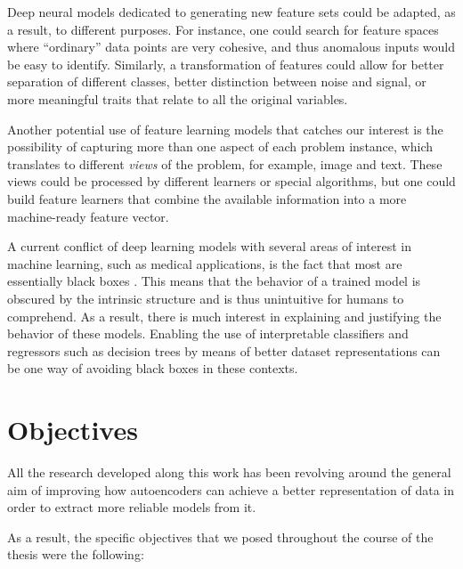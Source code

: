 Deep neural models dedicated to generating new feature sets could be adapted, as a result, to different purposes. For instance, one could search for feature spaces where ``ordinary'' data points are very cohesive, and thus anomalous inputs would be easy to identify. Similarly, a transformation of features could allow for better separation of different classes, better distinction between noise and signal, or more meaningful traits that relate to all the original variables.


Another potential use of feature learning models that catches our interest is the possibility of capturing more than one aspect of each problem instance, which translates to different \textit{views} of the problem, for example, image and text. These views could be processed by different learners or special algorithms, but one could build feature learners that combine the available information into a more machine-ready feature vector.


A current conflict of deep learning models with several areas of interest in machine learning, such as medical applications, is the fact that most are essentially black boxes . This means that the behavior of a trained model is obscured by the intrinsic structure and is thus unintuitive for humans to comprehend. As a result, there is much interest in explaining and justifying the behavior of these models. Enabling the use of interpretable classifiers and regressors such as decision trees by means of better dataset representations can be one way of avoiding black boxes in these contexts.

\section{Objectives}

All the research developed along this work has been revolving around the general aim of improving how autoencoders can achieve a better representation of data in order to extract more reliable models from it. 

As a result, the specific objectives that we posed throughout the course of the thesis were the following:

